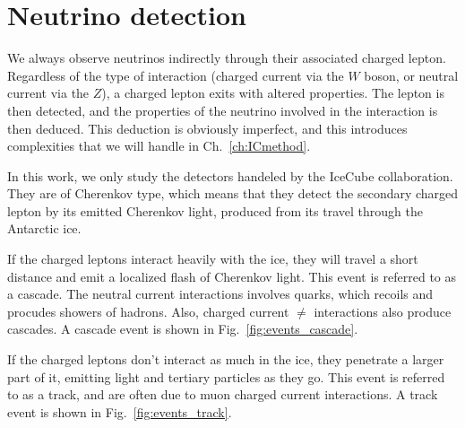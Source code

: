 \documentclass{thesis}
\begin{document}
\section{Neutrino detection}
We always observe neutrinos indirectly through their associated charged lepton. Regardless of the type of interaction (charged current via the $W$ boson, or neutral current
via the $Z$), a charged lepton exits with altered properties. The lepton is then detected, and the properties of the neutrino involved in the 
interaction is then deduced. This deduction is obviously imperfect, and this introduces complexities that we will handle in Ch.~\ref{ch:ICmethod}. 

In this work, we only study the detectors handeled by the IceCube collaboration. They are of Cherenkov type, which means that they detect 
the secondary charged lepton by its emitted Cherenkov light, produced from its travel through the Antarctic ice. 

If the charged leptons interact heavily with the ice, they will travel a short distance and emit a localized flash of 
Cherenkov light. This event is referred to as a cascade. The neutral current interactions involves quarks, which recoils and procudes
showers of hadrons. Also, charged current $\ne$ interactions also produce cascades. A cascade event 
is shown in Fig.~\ref{fig:events_cascade}.

If the charged leptons don't interact as much in the ice, they penetrate a larger part of it, emitting light and tertiary particles
as they go. This event is referred to as a track, and are often due to muon charged current interactions. A track event 
is shown in Fig.~\ref{fig:events_track}.
\end{document}
